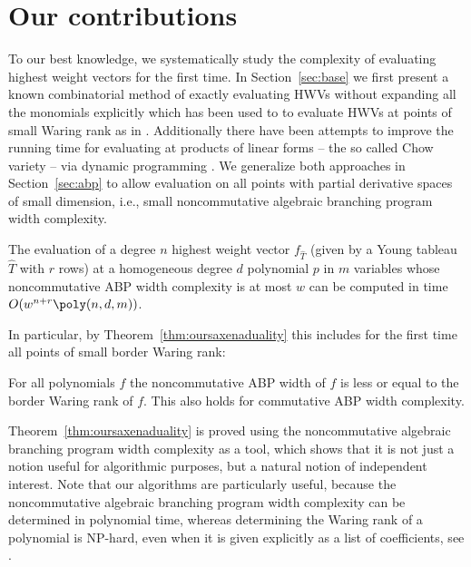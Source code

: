 \section{Our contributions}

To our best knowledge, we systematically study the complexity of evaluating highest weight vectors for the first time.
In Section~\ref{sec:base} we first present a known combinatorial method of exactly evaluating HWVs without expanding all the monomials explicitly which has been used to to evaluate HWVs at points of small Waring rank as in \cite{AIR:16, BI:17b}.
Additionally there have been attempts to improve the running time for evaluating at products of linear forms -- the so called Chow variety -- via dynamic programming \cite{DBLP:conf/icalp/DorflerIP19}.
We generalize both approaches in Section~\ref{sec:abp} to allow evaluation on all points with partial derivative spaces of small dimension, i.e., small noncommutative algebraic branching program width complexity.
\begin{theorem*thm:evalabp}
The evaluation of a degree $n$ highest weight vector $f_{\hat T}$ (given by a Young tableau ${\hat T}$ with $r$ rows) at a homogeneous degree $d$ polynomial $p$ in $m$ variables whose noncommutative ABP width complexity is at most $w$ can be computed in time $O(w^{n + r}\poly(n,d,m))$.
\end{theorem*thm:evalabp}
In particular, by Theorem~\ref{thm:oursaxenaduality} this includes for the first time all points of small border Waring rank:
\begin{theorem*thm:oursaxenaduality}
For all polynomials $f$ the noncommutative ABP width of $f$ is less or equal to the border Waring rank of $f$. This also holds for commutative ABP width complexity.
\end{theorem*thm:oursaxenaduality}
Theorem~\ref{thm:oursaxenaduality} is proved using the noncommutative algebraic branching program width complexity as a tool, which shows that it is not just a notion useful for algorithmic purposes, but a natural notion of independent interest.
Note that our algorithms are particularly useful, because the noncommutative algebraic branching program width complexity can be determined in polynomial time, whereas determining the Waring rank of a polynomial is NP-hard, even when it is given explicitly as a list of coefficients, see \cite{Shi:16}.

